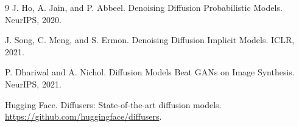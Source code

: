 \documentclass[10pt,twocolumn,letterpaper]{article}
\begin{document}
\begin{thebibliography}{9}
J. Ho, A. Jain, and P. Abbeel. Denoising Diffusion Probabilistic Models. NeurIPS, 2020.

J. Song, C. Meng, and S. Ermon. Denoising Diffusion Implicit Models. ICLR, 2021.

P. Dhariwal and A. Nichol. Diffusion Models Beat GANs on Image Synthesis. NeurIPS, 2021.

Hugging Face. Diffusers: State-of-the-art diffusion models. \url{https://github.com/huggingface/diffusers}.
\end{thebibliography}
\end{document}
